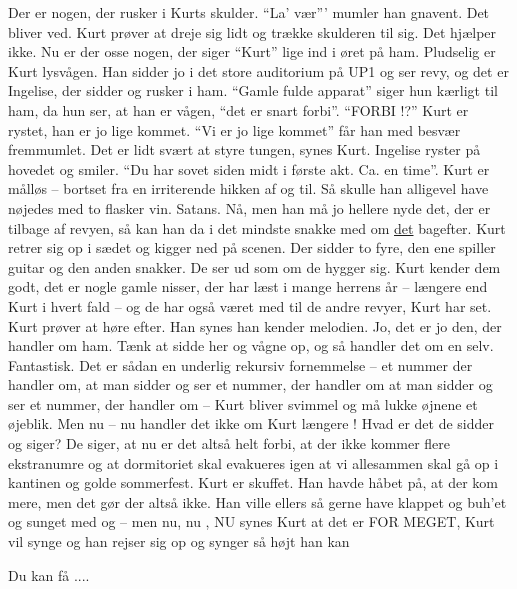 \documentclass[a4paper,11pt]{article}
\begin{document}
\begin{sketch}

Der er nogen, der rusker i Kurts skulder. ``La' vær''' mumler han gnavent. Det
bliver ved. Kurt prøver at dreje sig lidt og trække skulderen til sig. Det
hjælper ikke. Nu er der osse nogen, der siger ``Kurt'' lige ind i øret på
ham. Pludselig er Kurt lysvågen. Han sidder jo i det store auditorium på UP1 og
ser revy, og det er Ingelise, der sidder og rusker i ham. ``Gamle fulde
apparat'' siger hun kærligt til ham, da hun ser, at han er vågen, ``det er snart
forbi''. ``FORBI !?'' Kurt er rystet, han er jo lige kommet. ``Vi er jo lige
kommet'' får han med besvær fremmumlet. Det er lidt svært at styre tungen, synes
Kurt. Ingelise ryster på hovedet og smiler. ``Du har sovet siden midt i første
akt. Ca. en time''. Kurt er målløs -- bortset fra en irriterende hikken af og
til. Så skulle han alligevel have nøjedes med to flasker vin. Satans. Nå, men
han må jo hellere nyde det, der er tilbage af revyen, så kan han da i det
mindste snakke med om \underline{det} bagefter. Kurt retrer sig op i sædet og
kigger ned på scenen. Der sidder to fyre, den ene spiller guitar og den anden
snakker. De ser ud som om de hygger sig. Kurt kender dem godt, det er nogle
gamle nisser, der har læst i mange herrens år -- længere end Kurt i hvert fald
-- og de har også været med til de andre revyer, Kurt har set. Kurt prøver at
høre efter. Han synes han kender melodien. Jo, det er jo den, der handler om
ham.  Tænk at sidde her og vågne op, og så handler det om en
selv. Fantastisk. Det er sådan en underlig rekursiv fornemmelse -- et nummer der
handler om, at man sidder og ser et nummer, der handler om at man sidder og ser
et nummer, der handler om -- Kurt bliver svimmel og må lukke øjnene et
øjeblik. Men nu -- nu handler det ikke om Kurt længere ! Hvad er det de sidder
og siger?  De siger, at nu er det altså helt forbi, at der ikke kommer flere
ekstranumre og at dormitoriet skal evakueres igen at vi allesammen skal gå op i
kantinen og golde sommerfest. Kurt er skuffet. Han havde håbet på, at der kom
mere, men det gør der altså ikke. Han ville ellers så gerne have klappet og
buh'et og sunget med og -- men nu, nu , NU synes Kurt at det er FOR MEGET, Kurt
vil synge og han rejser sig op og synger så højt han kan
\end{sketch}

\begin{song}
Du kan få ....
\end{song}
\end{document}
